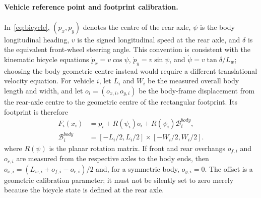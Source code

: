 \documentclass[letterpaper]{article} %
\begin{document}
\paragraph{Vehicle reference point and footprint calibration.}
In~\eqref{eq:bicycle}, $(p_x,p_y)$ denotes the centre of the rear axle,
$\psi$ is the body longitudinal heading, $v$ is the signed longitudinal
speed at the rear axle, and $\delta$ is the equivalent front-wheel steering
angle. This convention is consistent with the kinematic bicycle equations
$\dot p_x=v\cos\psi$, $\dot p_y=v\sin\psi$, and
$\dot\psi=v\tan\delta/L_w$; choosing the body geometric centre instead
would require a different translational velocity equation. For vehicle $i$,
let $L_i$ and $W_i$ be the measured overall body length and width, and let
$o_i=(o_{x,i},o_{y,i})$ be the body-frame displacement from the rear-axle
centre to the geometric centre of the rectangular footprint. Its footprint is
therefore
\begin{equation}
\begin{aligned}
F_i(x_i)&=p_i+R(\psi_i)o_i+R(\psi_i)\mathcal B_i^{body},\\
\mathcal B_i^{body}&=[-L_i/2,L_i/2]\times[-W_i/2,W_i/2].
\end{aligned}
\label{eq:rear-axle-footprint}
\end{equation}
where $R(\psi)$ is the planar rotation matrix. If front and rear overhangs
$o_{f,i}$ and $o_{r,i}$ are measured from the respective axles to the body
ends, then $o_{x,i}=(L_{w,i}+o_{f,i}-o_{r,i})/2$ and, for a symmetric
body, $o_{y,i}=0$. The offset is a geometric calibration parameter; it must
not be silently set to zero merely because the bicycle state is defined at
the rear axle.
\end{document}
